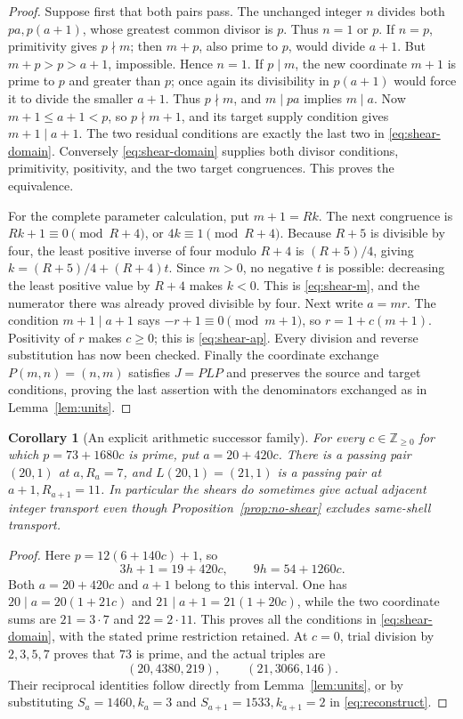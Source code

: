 \documentclass[11pt]{article}
\newtheorem{corollary}[theorem]{Corollary}
\theoremstyle{definition}\newtheorem{definition}[theorem]{Definition}
\theoremstyle{remark}\newtheorem{remark}[theorem]{Remark}
\newcommand{\Z}{\mathbb Z}\newcommand{\Q}{\mathbb Q}
\begin{document}
\begin{proof}
Suppose first that both pairs pass.  The unchanged integer \(n\)
divides both \(pa,p(a+1)\), whose greatest common divisor is \(p\).
Thus \(n=1\) or \(p\).  If \(n=p\), primitivity gives \(p\nmid m\);
then \(m+p\), also prime to \(p\), would divide \(a+1\).
But \(m+p>p>a+1\), impossible.  Hence \(n=1\).
If \(p\mid m\), the new coordinate \(m+1\) is prime to \(p\)
and greater than \(p\); once again its divisibility in \(p(a+1)\)
would force it to divide the smaller \(a+1\).  Thus \(p\nmid m\),
and \(m\mid pa\) implies \(m\mid a\).  Now
\(m+1\le a+1<p\), so \(p\nmid m+1\), and its target supply
condition gives \(m+1\mid a+1\).  The two residual conditions
are exactly the last two in \eqref{eq:shear-domain}.
Conversely \eqref{eq:shear-domain} supplies both divisor
conditions, primitivity, positivity, and the two target
congruences.  This proves the equivalence.

For the complete parameter calculation, put \(m+1=Rk\).
The next congruence is \(Rk+1\equiv0\pmod{R+4}\), or
\(4k\equiv1\pmod{R+4}\).  Because \(R+5\) is divisible by
four, the least positive inverse of four modulo \(R+4\) is
\((R+5)/4\), giving
\(k=(R+5)/4+(R+4)t\).  Since \(m>0\), no negative \(t\) is
possible: decreasing the least positive value by \(R+4\)
makes \(k<0\).  This is \eqref{eq:shear-m}, and the numerator
there was already proved divisible by four.
Next write \(a=mr\).  The condition \(m+1\mid a+1\) says
\(-r+1\equiv0\pmod{m+1}\), so \(r=1+c(m+1)\).
Positivity of \(r\) makes \(c\ge0\); this is
\eqref{eq:shear-ap}.  Every division and reverse substitution
has now been checked.  Finally the coordinate exchange
\(P(m,n)=(n,m)\) satisfies \(J=PLP\) and preserves the source
and target conditions, proving the last assertion with the
denominators exchanged as in Lemma~\ref{lem:units}.
\end{proof}

\begin{corollary}[An explicit arithmetic successor family]\label{cor:family}
For every \(c\in\Z_{\ge0}\) for which
\(p=73+1680c\) is prime, put \(a=20+420c\).
There is a passing pair \((20,1)\) at \(a,R_a=7\),
and \(L(20,1)=(21,1)\) is a passing pair at \(a+1,R_{a+1}=11\).
In particular the shears do sometimes give actual adjacent
integer transport even though Proposition~\ref{prop:no-shear}
excludes same-shell transport.
\end{corollary}
\begin{proof}
Here \(p=12(6+140c)+1\), so
\[
 3h+1=19+420c,\qquad 9h=54+1260c.
\]
Both \(a=20+420c\) and \(a+1\) belong to this interval.
One has \(20\mid a=20(1+21c)\) and
\(21\mid a+1=21(1+20c)\), while the two coordinate sums are
\(21=3\cdot7\) and \(22=2\cdot11\).
This proves all the conditions in \eqref{eq:shear-domain},
with the stated prime restriction retained.  At \(c=0\),
trial division by \(2,3,5,7\) proves that \(73\) is prime, and
the actual triples are
\[
 (20,4380,219),\qquad(21,3066,146).
\]
Their reciprocal identities follow directly from
Lemma~\ref{lem:units}, or by substituting \(S_a=1460,k_a=3\)
and \(S_{a+1}=1533,k_{a+1}=2\) in \eqref{eq:reconstruct}.
\end{proof}
\end{document}
